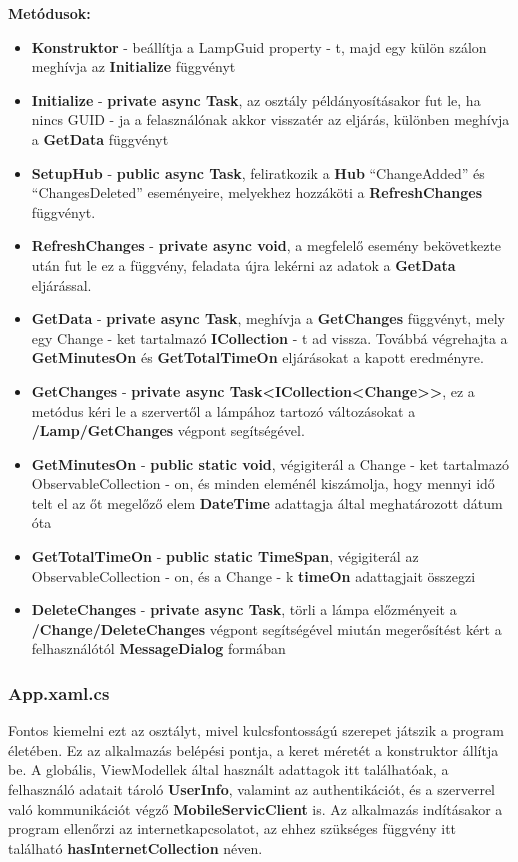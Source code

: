\documentclass[a4paper,12pt]{report}
\begin{document}
    \textbf{Metódusok:}

\begin{itemize}
    \item \textbf{Konstruktor} - beállítja a LampGuid property - t, majd egy külön szálon meghívja az \textbf{Initialize} függvényt
    \item \textbf{Initialize} - \textbf{private async Task}, az osztály példányosításakor fut le, ha nincs GUID - ja a felasználónak akkor
    visszatér az eljárás, különben meghívja a \textbf{GetData} függvényt
    \item \textbf{SetupHub} - \textbf{public async Task}, feliratkozik a \textbf{Hub} ``ChangeAdded'' és ``ChangesDeleted'' eseményeire,
    melyekhez hozzáköti a \textbf{RefreshChanges} függvényt.
    \item \textbf{RefreshChanges} - \textbf{private async void}, a megfelelő esemény bekövetkezte után fut le ez a függvény, feladata
    újra lekérni az adatok a \textbf{GetData} eljárással.
    \item \textbf{GetData} - \textbf{private async Task}, meghívja a \textbf{GetChanges} függvényt, mely egy Change - ket tartalmazó
    \textbf{ICollection} - t ad vissza. Továbbá végrehajta a \textbf{GetMinutesOn} és \textbf{GetTotalTimeOn} eljárásokat a kapott eredményre.
    \item \textbf{GetChanges} - \textbf{private async Task<ICollection<Change>>}, ez a metódus kéri le a szervertől a lámpához tartozó változásokat a
    \textbf{/Lamp/GetChanges} végpont segítségével.
    \item \textbf{GetMinutesOn} - \textbf{public static void}, végigiterál a Change - ket tartalmazó ObservableCollection - on, és minden eleménél
    kiszámolja, hogy mennyi idő telt el az őt megelőző elem \textbf{DateTime} adattagja által meghatározott dátum óta
    \item \textbf{GetTotalTimeOn} - \textbf{public static TimeSpan}, végigiterál az ObservableCollection - on, és a Change - k \textbf{timeOn} adattagjait
    összegzi
    \item \textbf{DeleteChanges} - \textbf{private async Task}, törli a lámpa előzményeit a \textbf{/Change/DeleteChanges} végpont segítségével
    miután megerősítést kért a felhasználótól \textbf{MessageDialog} formában
\end{itemize}

\subsubsection{App.xaml.cs}
    Fontos kiemelni ezt az osztályt, mivel kulcsfontosságú szerepet játszik a program életében. Ez az alkalmazás belépési pontja,
    a keret méretét a konstruktor állítja be. A globális, ViewModellek által használt adattagok itt találhatóak, a felhasználó adatait
    tároló \textbf{UserInfo}, valamint az authentikációt, és a szerverrel való kommunikációt végző \textbf{MobileServicClient} is.
    Az alkalmazás indításakor a program ellenőrzi az internetkapcsolatot, az ehhez szükséges függvény itt található \textbf{hasInternetCollection}
    néven.
\end{document}
